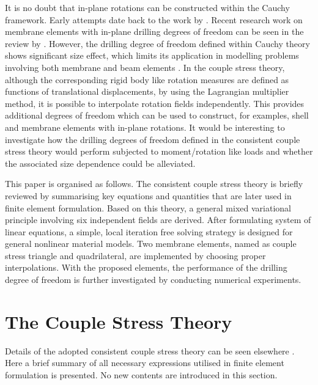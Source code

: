 \documentclass[3p,sort&compress,11pt,fleqn]{elsarticle}
\begin{document}
It is no doubt that in-plane rotations can be constructed within the Cauchy framework. Early attempts date back to the work by \citet{Allman1984}. Recent research work on membrane elements with in-plane drilling degrees of freedom can be seen in the review by \citet{Boutagouga2020}. However, the drilling degree of freedom defined within Cauchy theory shows significant size effect, which limits its application in modelling problems involving both membrane and beam elements \citep{Chang2020}. In the couple stress theory, although the corresponding rigid body like rotation measures are defined as functions of translational displacements, by using the Lagrangian multiplier method, it is possible to interpolate rotation fields independently. This provides additional degrees of freedom which can be used to construct, for examples, shell and membrane elements with in-plane rotations. It would be interesting to investigate how the drilling degrees of freedom defined in the consistent couple stress theory would perform subjected to moment/rotation like loads and whether the associated size dependence could be alleviated.

This paper is organised as follows. The consistent couple stress theory is briefly reviewed by summarising key equations and quantities that are later used in finite element formulation. Based on this theory, a general mixed variational principle involving six independent fields are derived. After formulating system of linear equations, a simple, local iteration free solving strategy is designed for general nonlinear material models. Two membrane elements, named as couple stress triangle and quadrilateral, are implemented by choosing proper interpolations. With the proposed elements, the performance of the drilling degree of freedom is further investigated by conducting numerical experiments.
\section{The Couple Stress Theory}
Details of the adopted consistent couple stress theory can be seen elsewhere \citep{Hadjesfandiari2011}. Here a brief summary of all necessary expressions utilised in finite element formulation is presented. No new contents are introduced in this section.
\end{document}
